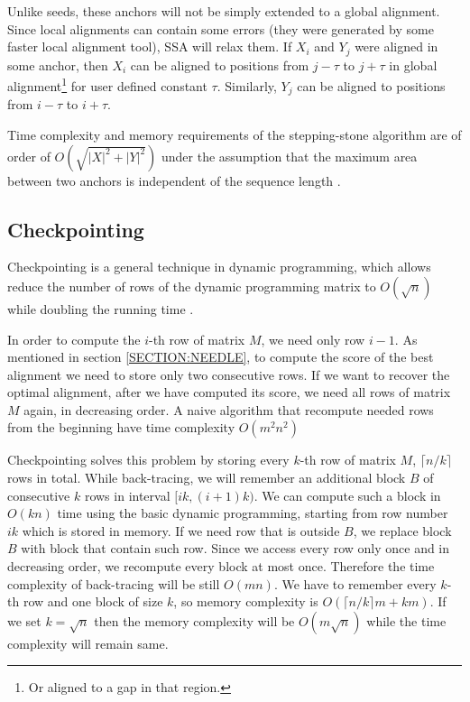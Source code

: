 Unlike seeds, these anchors will not be simply extended to a global alignment. Since
local alignments can contain some errors (they were generated by some faster
local alignment tool), SSA will relax them. If $X_i$ and $Y_j$ were aligned in
some anchor, then $X_i$ can be aligned to positions from $j-\tau$ to $j+\tau$ in
global alignment\footnote{Or aligned to a gap in that region.} for user defined
constant $\tau$. Similarly, $Y_j$ can be aligned to positions from $i-\tau$ to
$i+\tau$.

Time complexity and memory requirements of the stepping-stone algorithm are of
order of $O(\sqrt{|X|^2+|Y|^2})$ under the assumption that the maximum area between
two anchors is independent of the sequence length \cite{Meyer2002}.


\subsection{Checkpointing}

Checkpointing is a general technique in dynamic programming, which allows reduce
the number of rows of the dynamic programming matrix to $O(\sqrt n)$ while
doubling the running time
\cite{Grice1997}. 

In order to compute the $i$-th row of matrix $M$, we need only row $i-1$. As
mentioned in section \ref{SECTION:NEEDLE}, to compute the score of the best
alignment we need to store only
two consecutive rows.  If we want to
recover the optimal alignment, after we have computed its score, we need all
rows of matrix $M$ again, in decreasing order.
A naive algorithm that recompute needed rows from the beginning have
time complexity $O(m^2n^2)$

Checkpointing solves this problem by storing every $k$-th row of matrix $M$,
$\lceil n/k\rceil$ rows in total.  While back-tracing, we
will remember an additional block $B$ of consecutive $k$ rows in interval
$[ik,(i+1)k)$. We can compute such a block in $O(kn)$ time using the basic
 dynamic programming, starting from row number $ik$ which is stored in memory.  If we need row that
is outside $B$, we replace block $B$ with block that contain such row. Since we
access every row only once and in decreasing order, we recompute every block at
most once. Therefore the time complexity of back-tracing will be still $O(mn)$. We
have to remember every $k$-th row and one block of size $k$, so memory
complexity is $O(\lceil n/k\rceil m+ km)$. If we set $k=\sqrt n$ then the memory
complexity will be $O(m\sqrt n)$ while the time complexity will remain same.


